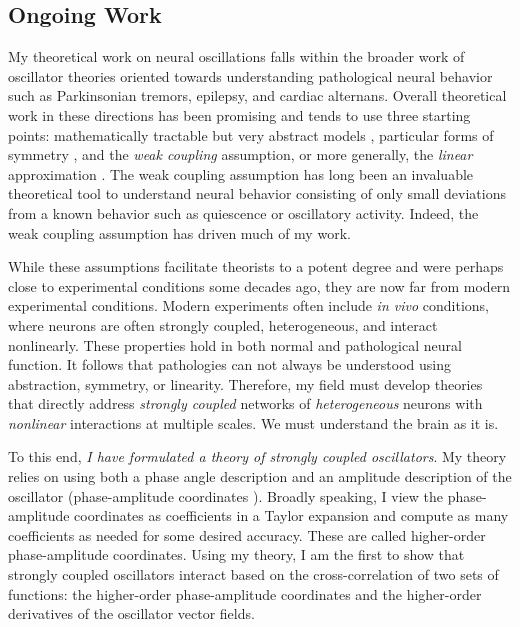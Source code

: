 \documentclass[a4paper,11pt]{article}
\begin{document}
\subsection{Ongoing Work}

My theoretical work on neural oscillations falls within the broader work of oscillator theories oriented towards understanding pathological neural behavior such as Parkinsonian tremors, epilepsy, and cardiac alternans. Overall theoretical work in these directions has been promising and tends to use three starting points: mathematically tractable but very abstract models \cite{ott2008low,kopell2014beyond,nicks2018clusters}, particular forms of symmetry \cite{golubitsky1986hopf,golubitsky2003symmetry,murza2011oscillation}, and the \textit{weak coupling} assumption, or more generally, the \textit{linear} approximation \cite{coombes2001phase,ermentrout2002modeling,coombes2012nonsmooth}. The weak coupling assumption has long been an invaluable theoretical tool to understand neural behavior consisting of only small deviations from a known behavior such as quiescence or oscillatory activity. Indeed, the weak coupling assumption has driven much of my work.  %

While these assumptions facilitate theorists to a potent degree and were perhaps close to experimental conditions some decades ago, they are now far from modern experimental conditions. Modern experiments often include \textit{in vivo} conditions, where neurons are often strongly coupled, heterogeneous, and interact nonlinearly. These properties hold in both normal and pathological neural function. It follows that pathologies can not always be understood using abstraction, symmetry, or linearity. Therefore, my field must develop theories that directly address \textit{strongly coupled} networks of \textit{heterogeneous} neurons with \textit{nonlinear} interactions at multiple scales. We must understand the brain as it is.

To this end, \textit{I have formulated a theory of strongly coupled oscillators}. My theory relies on using both a phase angle description and an amplitude description of the oscillator (phase-amplitude coordinates \cite{wilson2019phase,wilson2020phase}). Broadly speaking, I view the phase-amplitude coordinates as coefficients in a Taylor expansion and compute as many coefficients as needed for some desired accuracy. These are called higher-order phase-amplitude coordinates. Using my theory, I am the first to show that strongly coupled oscillators interact based on the cross-correlation of two sets of functions: the higher-order phase-amplitude coordinates and the higher-order derivatives of the oscillator vector fields.
\end{document}
